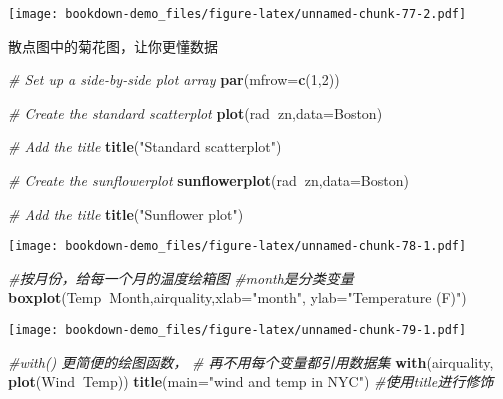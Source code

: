 \documentclass[]{book}
\newenvironment{Shaded}{\begin{snugshade}}{\end{snugshade}}
\newcommand{\CommentTok}[1]{\textcolor[rgb]{0.56,0.35,0.01}{\textit{#1}}}
\newcommand{\DataTypeTok}[1]{\textcolor[rgb]{0.13,0.29,0.53}{#1}}
\newcommand{\DecValTok}[1]{\textcolor[rgb]{0.00,0.00,0.81}{#1}}
\newcommand{\KeywordTok}[1]{\textcolor[rgb]{0.13,0.29,0.53}{\textbf{#1}}}
\newcommand{\NormalTok}[1]{#1}
\newcommand{\OperatorTok}[1]{\textcolor[rgb]{0.81,0.36,0.00}{\textbf{#1}}}
\newcommand{\StringTok}[1]{\textcolor[rgb]{0.31,0.60,0.02}{#1}}
\begin{document}
\texttt{[image: bookdown-demo\_files/figure-latex/unnamed-chunk-77-2.pdf]}

散点图中的菊花图，让你更懂数据

\begin{Shaded}
\begin{Highlighting}[]
\CommentTok{# Set up a side-by-side plot array}
\KeywordTok{par}\NormalTok{(}\DataTypeTok{mfrow=}\KeywordTok{c}\NormalTok{(}\DecValTok{1}\NormalTok{,}\DecValTok{2}\NormalTok{))}

\CommentTok{# Create the standard scatterplot}
\KeywordTok{plot}\NormalTok{(rad}\OperatorTok{~}\NormalTok{zn,}\DataTypeTok{data=}\NormalTok{Boston)}

\CommentTok{# Add the title}
\KeywordTok{title}\NormalTok{(}\StringTok{"Standard scatterplot"}\NormalTok{)}

\CommentTok{# Create the sunflowerplot}
\KeywordTok{sunflowerplot}\NormalTok{(rad}\OperatorTok{~}\NormalTok{zn,}\DataTypeTok{data=}\NormalTok{Boston)}

\CommentTok{# Add the title}
\KeywordTok{title}\NormalTok{(}\StringTok{"Sunflower plot"}\NormalTok{)}
\end{Highlighting}
\end{Shaded}

\texttt{[image: bookdown-demo\_files/figure-latex/unnamed-chunk-78-1.pdf]}

\begin{Shaded}
\begin{Highlighting}[]
\CommentTok{#按月份，给每一个月的温度绘箱图}
\CommentTok{#month是分类变量}
\KeywordTok{boxplot}\NormalTok{(Temp}\OperatorTok{~}\NormalTok{Month,airquality,}\DataTypeTok{xlab=}\StringTok{"month"}\NormalTok{, }
        \DataTypeTok{ylab=}\StringTok{"Temperature (F)"}\NormalTok{)}
\end{Highlighting}
\end{Shaded}

\texttt{[image: bookdown-demo\_files/figure-latex/unnamed-chunk-79-1.pdf]}

\begin{Shaded}
\begin{Highlighting}[]
\CommentTok{#with() 更简便的绘图函数，}
\CommentTok{# 再不用每个变量都引用数据集}
\KeywordTok{with}\NormalTok{(airquality, }\KeywordTok{plot}\NormalTok{(Wind}\OperatorTok{~}\NormalTok{Temp))}
\KeywordTok{title}\NormalTok{(}\DataTypeTok{main=}\StringTok{"wind and temp in NYC"}\NormalTok{) }\CommentTok{#使用title进行修饰}
\end{Highlighting}
\end{Shaded}
\end{document}
